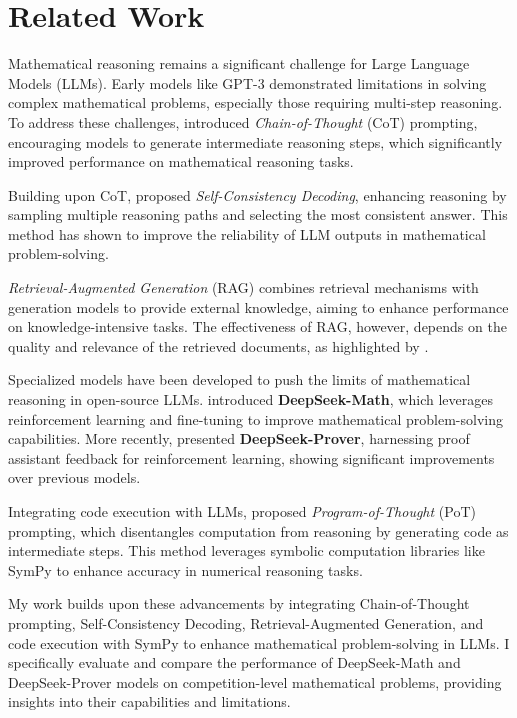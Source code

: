 \documentclass[11pt,a4paper]{article}
\begin{document}
\section{Related Work}

Mathematical reasoning remains a significant challenge for Large Language Models (LLMs). Early models like GPT-3 \cite{brown2020language} demonstrated limitations in solving complex mathematical problems, especially those requiring multi-step reasoning. To address these challenges, \citet{wei2023chainofthoughtpromptingelicitsreasoning} introduced \textit{Chain-of-Thought} (CoT) prompting, encouraging models to generate intermediate reasoning steps, which significantly improved performance on mathematical reasoning tasks.

Building upon CoT, \citet{wang2023selfconsistencyimproveschainthought} proposed \textit{Self-Consistency Decoding}, enhancing reasoning by sampling multiple reasoning paths and selecting the most consistent answer. This method has shown to improve the reliability of LLM outputs in mathematical problem-solving.

\textit{Retrieval-Augmented Generation} (RAG) \cite{lewis2021retrievalaugmentedgenerationknowledgeintensivenlp} combines retrieval mechanisms with generation models to provide external knowledge, aiming to enhance performance on knowledge-intensive tasks. The effectiveness of RAG, however, depends on the quality and relevance of the retrieved documents, as highlighted by \citet{khattab2020colbert}.

Specialized models have been developed to push the limits of mathematical reasoning in open-source LLMs. \citet{shao2024deepseekmathpushinglimitsmathematical} introduced \textbf{DeepSeek-Math}, which leverages reinforcement learning and fine-tuning to improve mathematical problem-solving capabilities. More recently, \citet{xin2024deepseekproverv15harnessingproofassistant} presented \textbf{DeepSeek-Prover}, harnessing proof assistant feedback for reinforcement learning, showing significant improvements over previous models.

Integrating code execution with LLMs, \citet{chen2023programthoughtspromptingdisentangling} proposed \textit{Program-of-Thought} (PoT) prompting, which disentangles computation from reasoning by generating code as intermediate steps. This method leverages symbolic computation libraries like SymPy \cite{meurer2017sympy} to enhance accuracy in numerical reasoning tasks.

My work builds upon these advancements by integrating Chain-of-Thought prompting, Self-Consistency Decoding, Retrieval-Augmented Generation, and code execution with SymPy to enhance mathematical problem-solving in LLMs. I specifically evaluate and compare the performance of DeepSeek-Math and DeepSeek-Prover models on competition-level mathematical problems, providing insights into their capabilities and limitations.
\end{document}
